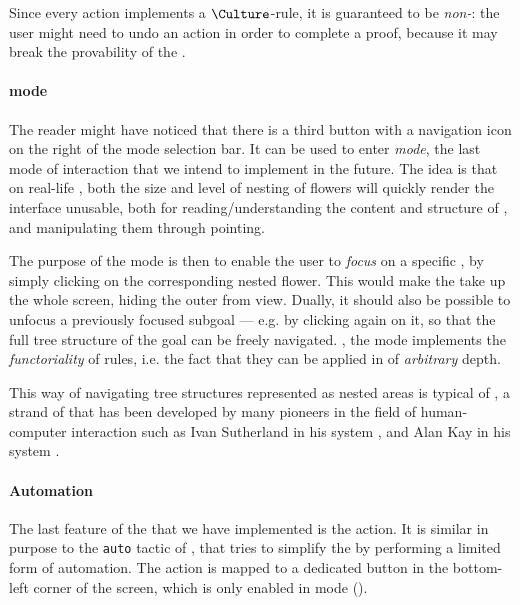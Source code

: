 \begin{scope}
Since every \Edit action implements a $\Culture$-rule, it is guaranteed to be
\emph{non-}: the user might need to undo an \Edit action in order to
complete a proof, because it may break the provability of the .

\paragraph{\Navigation mode}

The reader might have noticed that there is a third button with a navigation
icon on the right of the mode selection bar. It can be used to enter
\emph{\Navigation mode}, the last mode of interaction that we intend to implement
in the future. The idea is that on real-life , both the size and level of
nesting of flowers will quickly render the interface unusable, both for
reading/understanding the content and structure of , and manipulating them
through pointing.

The purpose of the \Navigation mode is then to enable the user to \emph{focus} on
a specific , by simply clicking on the corresponding nested flower. This
would make the  take up the whole screen, hiding the outer  from
view. Dually, it should also be possible to unfocus a previously focused subgoal
--- e.g. by clicking again on it, so that the full tree structure of the goal
can be freely navigated. , the \Navigation mode implements the
\emph{functoriality} of rules, i.e. the fact that they can be applied in
 of \emph{arbitrary} depth.

\begin{remark}
This way of navigating tree structures represented as nested areas is typical of
, a strand of  that has been developed by
many pioneers in the field of human-computer interaction such as Ivan Sutherland
in his  system , and Alan Kay
in his  system .
\end{remark}

\paragraph{Automation}

The last feature of the  that we have implemented is the
 \Proof action. It is similar in purpose to the \texttt{auto}
tactic of , that tries to simplify the  by performing a limited form of
automation. The  action is mapped to a dedicated button in the
bottom-left corner of the screen, which is only enabled in \Proof mode
().


\end{scope}
